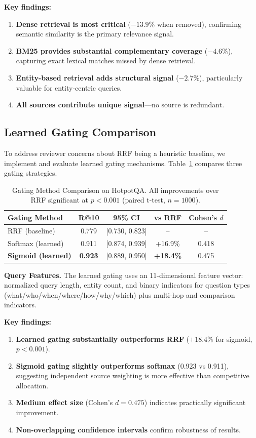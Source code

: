\documentclass[11pt,a4paper]{article}
\begin{document}
\textbf{Key findings:}
\begin{enumerate}
    \item \textbf{Dense retrieval is most critical} ($-13.9\%$ when removed), confirming semantic similarity is the primary relevance signal.
    \item \textbf{BM25 provides substantial complementary coverage} ($-4.6\%$), capturing exact lexical matches missed by dense retrieval.
    \item \textbf{Entity-based retrieval adds structural signal} ($-2.7\%$), particularly valuable for entity-centric queries.
    \item \textbf{All sources contribute unique signal}---no source is redundant.
\end{enumerate}

\subsection{Learned Gating Comparison}

To address reviewer concerns about RRF being a heuristic baseline, we implement and evaluate learned gating mechanisms. Table~\ref{tab:gating_comparison} compares three gating strategies.

\begin{table}[h]
\centering
\caption{Gating Method Comparison on HotpotQA. All improvements over RRF significant at $p<0.001$ (paired t-test, $n=1000$).}
\label{tab:gating_comparison}
\begin{tabular}{lcccc}
\toprule
\textbf{Gating Method} & \textbf{R@10} & \textbf{95\% CI} & \textbf{vs RRF} & \textbf{Cohen's $d$} \\
\midrule
RRF (baseline) & 0.779 & [0.730, 0.823] & -- & -- \\
Softmax (learned) & 0.911 & [0.874, 0.939] & +16.9\% & 0.418 \\
\textbf{Sigmoid (learned)} & \textbf{0.923} & [0.889, 0.950] & \textbf{+18.4\%} & 0.475 \\
\bottomrule
\end{tabular}
\end{table}

\textbf{Query Features.} The learned gating uses an 11-dimensional feature vector: normalized query length, entity count, and binary indicators for question types (what/who/when/where/how/why/which) plus multi-hop and comparison indicators.

\textbf{Key findings:}
\begin{enumerate}
    \item \textbf{Learned gating substantially outperforms RRF} ($+18.4\%$ for sigmoid, $p<0.001$).
    \item \textbf{Sigmoid gating slightly outperforms softmax} (0.923 vs 0.911), suggesting independent source weighting is more effective than competitive allocation.
    \item \textbf{Medium effect size} (Cohen's $d=0.475$) indicates practically significant improvement.
    \item \textbf{Non-overlapping confidence intervals} confirm robustness of results.
\end{enumerate}
\end{document}
